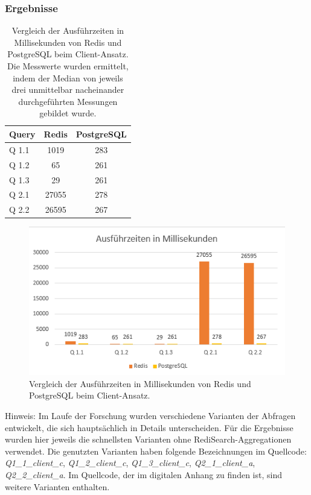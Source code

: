 \subsubsection{Ergebnisse}
\begin{table}[h]
\centering
\begin{tabular}{lcc}
\hline
Query & Redis & PostgreSQL \\ \hline
Q 1.1 & 1019  & 283       \\
Q 1.2 & 65    & 261       \\
Q 1.3 & 29    & 261       \\
Q 2.1 & 27055 & 278       \\
Q 2.2 & 26595 & 267       \\ \hline
\end{tabular}
\caption{Vergleich der Ausführzeiten in Millisekunden von Redis und PostgreSQL beim Client-Ansatz.\\
 Die Messwerte wurden ermittelt, indem der Median von jeweils drei unmittelbar nacheinander durchgeführten Messungen gebildet wurde.}
\label{tab:results-client}
\end{table}
\begin{figure}[ht]  %
    \centering      %
    \includegraphics[width=1\textwidth]{pictures/results/results-client.png}
    \caption{Vergleich der Ausführzeiten in Millisekunden von Redis und PostgreSQL beim Client-Ansatz.}      %
    \label{pic:results-client}    %
\end{figure}

Hinweis: Im Laufe der Forschung wurden verschiedene Varianten der Abfragen entwickelt, die sich hauptsächlich in Details unterscheiden. Für die Ergebnisse wurden hier jeweils die schnellsten Varianten ohne RediSearch-Aggregationen verwendet. Die genutzten Varianten haben folgende Bezeichnungen im Quellcode: \emph{Q1\_1\_client\_c}, \emph{Q1\_2\_client\_c}, \emph{Q1\_3\_client\_c}, \emph{Q2\_1\_client\_a}, \emph{Q2\_2\_client\_a}. Im Quellcode, der im digitalen Anhang zu finden ist, sind weitere Varianten enthalten.

